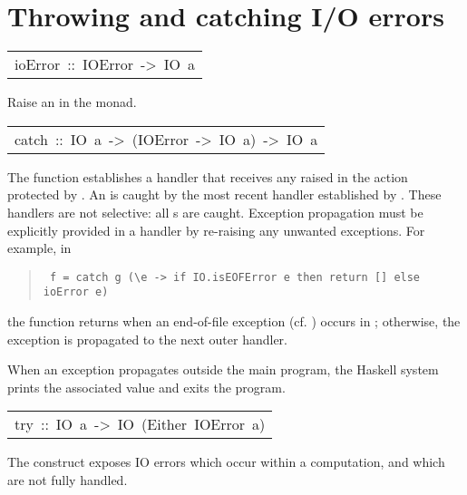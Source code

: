 \section{Throwing and catching I/O errors
}
\begin{haddockdesc}
\item[\begin{tabular}{@{}l}
ioError\ ::\ IOError\ ->\ IO\ a
\end{tabular}]\haddockbegindoc
Raise an  in the  monad.
\par

\end{haddockdesc}
\begin{haddockdesc}
\item[\begin{tabular}{@{}l}
catch\ ::\ IO\ a\ ->\ (IOError\ ->\ IO\ a)\ ->\ IO\ a
\end{tabular}]\haddockbegindoc
The  function establishes a handler that receives any 
 raised in the action protected by .  An  is caught by
 the most recent handler established by .  These handlers are
 not selective: all s are caught.  Exception propagation
 must be explicitly provided in a handler by re-raising any unwanted
 exceptions.  For example, in
\par
\begin{quote}
{\haddockverb\begin{verbatim}
 f = catch g (\e -> if IO.isEOFError e then return [] else ioError e)
\end{verbatim}}
\end{quote}
the function  returns  when an end-of-file exception
 (cf. ) occurs in ; otherwise, the
 exception is propagated to the next outer handler.
\par
When an exception propagates outside the main program, the Haskell
 system prints the associated  value and exits the program.
\par

\end{haddockdesc}
\begin{haddockdesc}
\item[\begin{tabular}{@{}l}
try\ ::\ IO\ a\ ->\ IO\ (Either\ IOError\ a)
\end{tabular}]\haddockbegindoc
The construct   exposes IO errors which occur within a
 computation, and which are not fully handled.
\par

\end{haddockdesc}